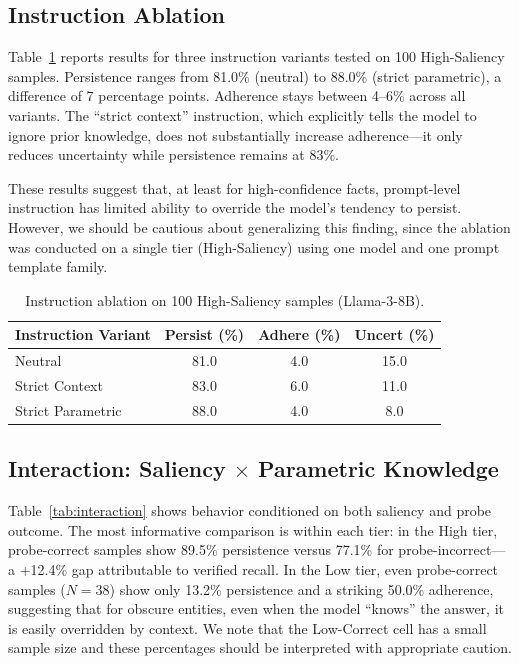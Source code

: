 \documentclass[11pt, letterpaper]{article}
\begin{document}
\subsection*{Instruction Ablation}

Table~\ref{tab:ablation} reports results for three instruction variants tested on 100 High-Saliency samples. Persistence ranges from 81.0\% (neutral) to 88.0\% (strict parametric), a difference of 7 percentage points. Adherence stays between 4--6\% across all variants. The ``strict context'' instruction, which explicitly tells the model to ignore prior knowledge, does not substantially increase adherence---it only reduces uncertainty while persistence remains at 83\%.

These results suggest that, at least for high-confidence facts, prompt-level instruction has limited ability to override the model's tendency to persist. However, we should be cautious about generalizing this finding, since the ablation was conducted on a single tier (High-Saliency) using one model and one prompt template family.

\begin{table}[H]
\centering
\caption{Instruction ablation on 100 High-Saliency samples (Llama-3-8B).}
\label{tab:ablation}
\begin{tabular}{l|ccc}
\toprule
\textbf{Instruction Variant} & \textbf{Persist (\%)} & \textbf{Adhere (\%)} & \textbf{Uncert (\%)} \\
\midrule
Neutral            & 81.0 & 4.0 & 15.0 \\
Strict Context     & 83.0 & 6.0 & 11.0 \\
Strict Parametric  & 88.0 & 4.0 &  8.0 \\
\bottomrule
\end{tabular}
\end{table}

\subsection*{Interaction: Saliency $\times$ Parametric Knowledge}

Table~\ref{tab:interaction} shows behavior conditioned on both saliency and probe outcome. The most informative comparison is within each tier: in the High tier, probe-correct samples show 89.5\% persistence versus 77.1\% for probe-incorrect---a +12.4\% gap attributable to verified recall. In the Low tier, even probe-correct samples ($N=38$) show only 13.2\% persistence and a striking 50.0\% adherence, suggesting that for obscure entities, even when the model ``knows'' the answer, it is easily overridden by context. We note that the Low-Correct cell has a small sample size and these percentages should be interpreted with appropriate caution.
\end{document}
